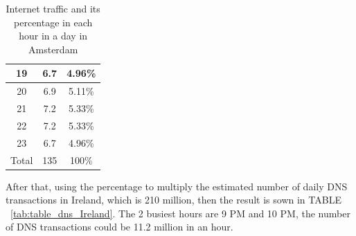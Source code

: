 \documentclass[conference]{IEEEtran}
\begin{document}
\begin{table}[hbt!]
\begin{tabular}{|c|c|c|}
        \hline
        19 & 6.7 & 4.96\%  \\
        \hline
        20 & 6.9 & 5.11\%  \\
        \hline
        21 & 7.2 & 5.33\%  \\
        \hline
        22 & 7.2 & 5.33\%  \\
        \hline
        23 & 6.7 & 4.96\% \\
        \hline
        Total & 135 & 100\%  \\
        \hline
    \end{tabular}
    \caption{Internet traffic and its percentage in each hour in a day in Amsterdam \cite{Amsterdam_internet_traffic}}
    \label{tab:table_amsterdam}
\end{table}

After that, using the percentage to multiply the estimated number of daily DNS transactions in Ireland, which is 210 million, then the result is sown in TABLE ~\ref{tab:table_dns_Ireland}. The 2 busiest hours are 9 PM and 10 PM, the number of DNS transactions could be  11.2 million in an hour.
\\
\end{document}
